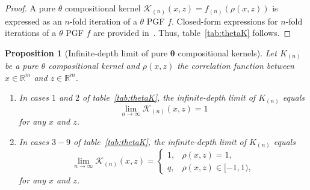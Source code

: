 \documentclass[final, 12pt]{colt2021} %
\newtheorem{prop}{Proposition}
\begin{document}
\begin{proof}
A pure $\theta$ compositional kernel
$\mathcal{K}_{(n)}(x,z)=f_{(n)}(\rho (x, z))$
is expressed as an $n$-fold iteration of a $\theta$ PGF $f$.
Closed-form expressions for $n$-fold iterations of a $\theta$ PGF $f$
are provided in~\citet[section 4]{sagitov2016}.
Thus, table~\ref{tab:thetaK} follows.
\end{proof}




\begin{prop}[Infinite-depth limit of pure $\boldsymbol{\theta}$ compositional kernels]
\label{prop:theta_kernel_limit}
Let $K_{(n)}$ be a pure $\theta$ compositional kernel
and $\rho (x, z)$
the correlation function between
$x\in\mathbb{R}^m$ and $z\in\mathbb{R}^m$.

\begin{enumerate}
\item In cases $1$ and $2$ of table~\ref{tab:thetaK},
the infinite-depth limit of $K_{(n)}$
equals
\begin{equation}\label{eq:sub_and_critical}
\lim_{n\rightarrow\infty}
\mathcal{K}_{(n)}(x,z) = 1
\end{equation}
for any
$x$ and $z$.
\item In cases $3-9$ of table~\ref{tab:thetaK},
the infinite-depth limit of $K_{(n)}$
equals
\begin{equation}\label{eq:supercritical}
\lim_{n\rightarrow\infty}
\mathcal{K}_{(n)}(x,z) =
\left\{
\begin{array}{ll}
1, & \rho (x, z) = 1,\\
q, & \rho (x, z) \in [-1, 1),
\end{array}
\right.
\end{equation}
for any
$x$ and $z$.
\end{enumerate}
\end{prop}
\end{document}
